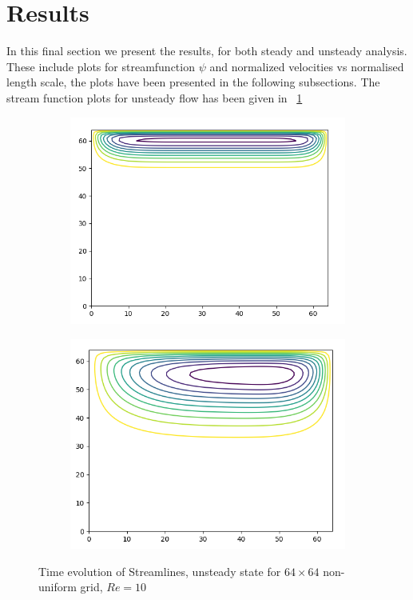 \documentclass{article}
\begin{document}
\section{Results}
In this final section we present the results, for both steady and unsteady analysis. These include plots for streamfunction $\psi$ and normalized velocities vs normalised length scale, the plots have been presented in the following subsections. The stream function plots for unsteady flow has been given in ~\ref{fig:res}

\begin{figure}
  \begin{subfigure}[b]{0.5\textwidth}
    \includegraphics[width=\textwidth]{r1.png}
  \end{subfigure}
  \begin{subfigure}[b]{0.5\textwidth}
    \includegraphics[width=\textwidth]{r2.png}
  \end{subfigure}
      \caption{Time evolution of Streamlines, unsteady state for $64\times64$ non-uniform grid, $Re=10$}
\label{fig:res}
\end{figure}
\end{document}
